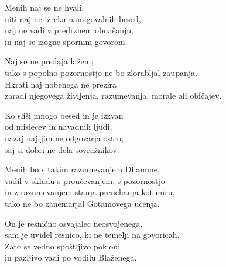 Menih naj se ne hvali,\\
niti naj ne izreka namigovalnih besed,\\
naj ne vadi v predrznem obnašanju,\\
in naj se izogne spornim govorom.

Naj se ne predaja lažem;\\
tako s popolno pozornostjo ne bo zlorabljal zaupanja.\\
Hkrati naj nobenega ne prezira\\
zaradi njegovega življenja, razumevanja, morale ali običajev.

Ko sliši mnogo besed in je izzvan\\
od mislecev in navadnih ljudi,\\
nazaj naj jim ne odgovarja ostro,\\
saj si dobri ne dela sovražnikov.

Menih bo s takim razumevanjem Dhamme,\\
vadil v skladu s proučevanjem, s pozornostjo\\
in z razumevanjem stanja prenehanja kot miru,\\
tako ne bo zanemarjal Gotamovega učenja.

On je resnično osvajalec neosvojenega,\\
sam je uvidel resnico, ki ne temelji na govoricah.\\
Zato se vedno spoštljivo pokloni\\
in pazljivo vadi po vodilu Blaženega.

